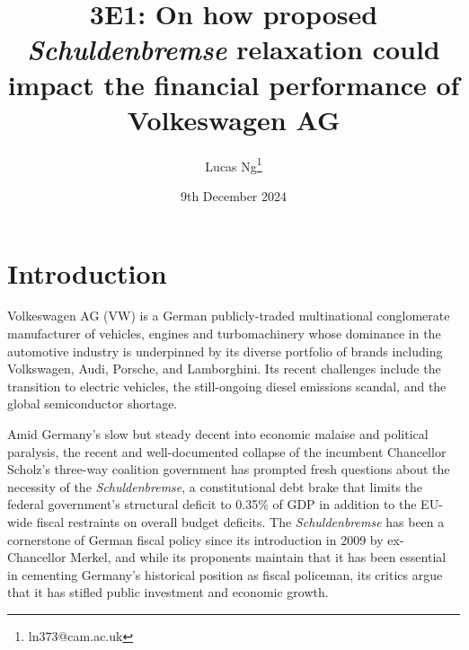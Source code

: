 \documentclass[10pt]{article}
\title{3E1: On how proposed \textit{Schuldenbremse} relaxation could impact the financial performance of Volkeswagen AG}
\author{Lucas Ng\footnote{ln373@cam.ac.uk}}
\date{9th December 2024}
\begin{document}
\maketitle


\section{Introduction}
Volkeswagen AG (VW) is a German publicly-traded multinational conglomerate manufacturer of vehicles, engines and turbomachinery whose dominance in the automotive industry is underpinned by its diverse portfolio of brands including Volkswagen, Audi, Porsche, and Lamborghini. Its recent challenges include the transition to electric vehicles, the still-ongoing diesel emissions scandal, and the global semiconductor shortage.

Amid Germany's slow but steady decent into economic malaise and political paralysis, the recent and well-documented collapse of the incumbent Chancellor Scholz's three-way coalition government has prompted fresh questions about the necessity of the \textit{Schuldenbremse}, a constitutional debt brake that limits the federal government's structural deficit to 0.35\% of GDP in addition to the EU-wide fiscal restraints on overall budget deficits.\@
The \textit{Schuldenbremse} has been a cornerstone of German fiscal policy since its introduction in 2009 by ex-Chancellor Merkel,
and while its proponents maintain that it has been essential in cementing Germany's historical position as fiscal policeman, its critics argue that it has stifled public investment and economic growth.
\end{document}
